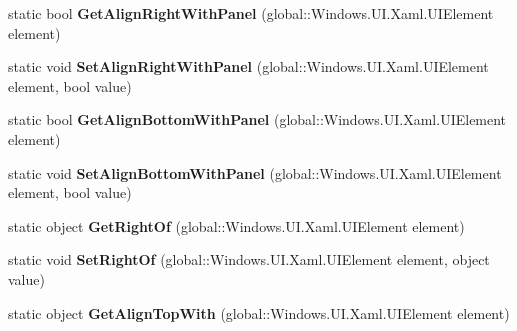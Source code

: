 \begin{DoxyCompactItemize}
\item 
\mbox{\label{class_windows_1_1_u_i_1_1_xaml_1_1_controls_1_1_relative_panel_ae3766e96075e9f3f5c1aec5f5d7a97cb}} 
static bool {\bfseries Get\+Align\+Right\+With\+Panel} (global\+::\+Windows.\+U\+I.\+Xaml.\+U\+I\+Element element)
\item 
\mbox{\label{class_windows_1_1_u_i_1_1_xaml_1_1_controls_1_1_relative_panel_ad7c025028b52f2ddf66289f89611fc2d}} 
static void {\bfseries Set\+Align\+Right\+With\+Panel} (global\+::\+Windows.\+U\+I.\+Xaml.\+U\+I\+Element element, bool value)
\item 
\mbox{\label{class_windows_1_1_u_i_1_1_xaml_1_1_controls_1_1_relative_panel_a5e7cb6ab9a90cb2896e3457bc67ca59b}} 
static bool {\bfseries Get\+Align\+Bottom\+With\+Panel} (global\+::\+Windows.\+U\+I.\+Xaml.\+U\+I\+Element element)
\item 
\mbox{\label{class_windows_1_1_u_i_1_1_xaml_1_1_controls_1_1_relative_panel_a52f3e04276443ca31df8ca10c97cfb60}} 
static void {\bfseries Set\+Align\+Bottom\+With\+Panel} (global\+::\+Windows.\+U\+I.\+Xaml.\+U\+I\+Element element, bool value)
\item 
\mbox{\label{class_windows_1_1_u_i_1_1_xaml_1_1_controls_1_1_relative_panel_ad529f58ba41f4e74aaae2ee84288f5d2}} 
static object {\bfseries Get\+Right\+Of} (global\+::\+Windows.\+U\+I.\+Xaml.\+U\+I\+Element element)
\item 
\mbox{\label{class_windows_1_1_u_i_1_1_xaml_1_1_controls_1_1_relative_panel_a9559e4960630a4b153111ba23f0e51a0}} 
static void {\bfseries Set\+Right\+Of} (global\+::\+Windows.\+U\+I.\+Xaml.\+U\+I\+Element element, object value)
\item 
\mbox{\label{class_windows_1_1_u_i_1_1_xaml_1_1_controls_1_1_relative_panel_a26c367e9f2c099f097099bb693c02c02}} 
static object {\bfseries Get\+Align\+Top\+With} (global\+::\+Windows.\+U\+I.\+Xaml.\+U\+I\+Element element)

\end{DoxyCompactItemize}
